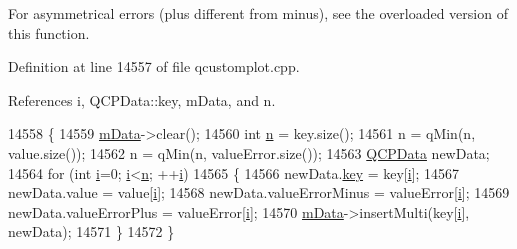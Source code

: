 For asymmetrical errors (plus different from minus), see the overloaded version of this function. 

Definition at line 14557 of file qcustomplot.\+cpp.



References i, Q\+C\+P\+Data\+::key, m\+Data, and n.


\begin{DoxyCode}
14558 \{
14559   \hyperlink{class_q_c_p_graph_a8457c840f69a0ac49f61d30a509c5d08}{mData}->clear();
14560   \textcolor{keywordtype}{int} \hyperlink{_comparision_pictures_2_createtest_image_8m_aeab71244afb687f16d8c4f5ee9d6ef0e}{n} = key.size();
14561   n = qMin(n, value.size());
14562   n = qMin(n, valueError.size());
14563   \hyperlink{class_q_c_p_data}{QCPData} newData;
14564   \textcolor{keywordflow}{for} (\textcolor{keywordtype}{int} \hyperlink{_comparision_pictures_2_createtest_image_8m_a6f6ccfcf58b31cb6412107d9d5281426}{i}=0; \hyperlink{_comparision_pictures_2_createtest_image_8m_a6f6ccfcf58b31cb6412107d9d5281426}{i}<\hyperlink{_comparision_pictures_2_createtest_image_8m_aeab71244afb687f16d8c4f5ee9d6ef0e}{n}; ++\hyperlink{_comparision_pictures_2_createtest_image_8m_a6f6ccfcf58b31cb6412107d9d5281426}{i})
14565   \{
14566     newData.\hyperlink{class_q_c_p_data_a2f5ba9aca61bb74f88516e148a4cf71b}{key} = key[\hyperlink{_comparision_pictures_2_createtest_image_8m_a6f6ccfcf58b31cb6412107d9d5281426}{i}];
14567     newData.value = value[\hyperlink{_comparision_pictures_2_createtest_image_8m_a6f6ccfcf58b31cb6412107d9d5281426}{i}];
14568     newData.valueErrorMinus = valueError[\hyperlink{_comparision_pictures_2_createtest_image_8m_a6f6ccfcf58b31cb6412107d9d5281426}{i}];
14569     newData.valueErrorPlus = valueError[\hyperlink{_comparision_pictures_2_createtest_image_8m_a6f6ccfcf58b31cb6412107d9d5281426}{i}];
14570     \hyperlink{class_q_c_p_graph_a8457c840f69a0ac49f61d30a509c5d08}{mData}->insertMulti(key[\hyperlink{_comparision_pictures_2_createtest_image_8m_a6f6ccfcf58b31cb6412107d9d5281426}{i}], newData);
14571   \}
14572 \}
\end{DoxyCode}
\hypertarget{class_q_c_p_graph_a3afbfd7222d739351c69387904776f93}{}
